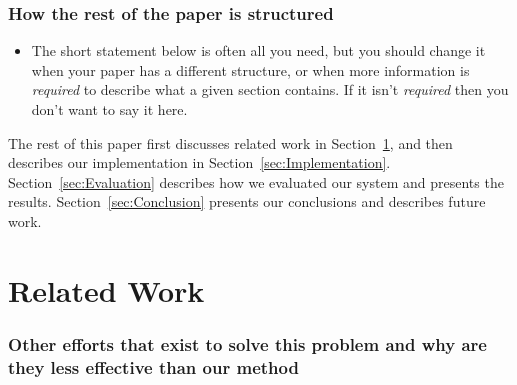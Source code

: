 \documentclass[11pt]{article}
\newcommand{\secref}[1]{Section~\ref{#1}}
\begin{document}
\subsubsection* {How the rest of the paper is structured}
\begin{itemize}
\item
The short statement below is often all you need, but you should change it when
your paper has a different structure, or when more information is {\em
required} to describe what a given section contains. If it isn't {\em required}
then you don't want to say it here.

\end{itemize}

The rest of this paper first discusses related work in
\secref{sec:RelatedWork}, and then describes our implementation in
\secref{sec:Implementation}. \secref{sec:Evaluation} describes how we evaluated
our system and presents the results. \secref{sec:Conclusion} presents our
conclusions and describes future work.


\section{Related Work}
\label{sec:RelatedWork}

\subsubsection*{Other efforts that exist to solve this problem and why are they
less effective than our method}
\end{document}
